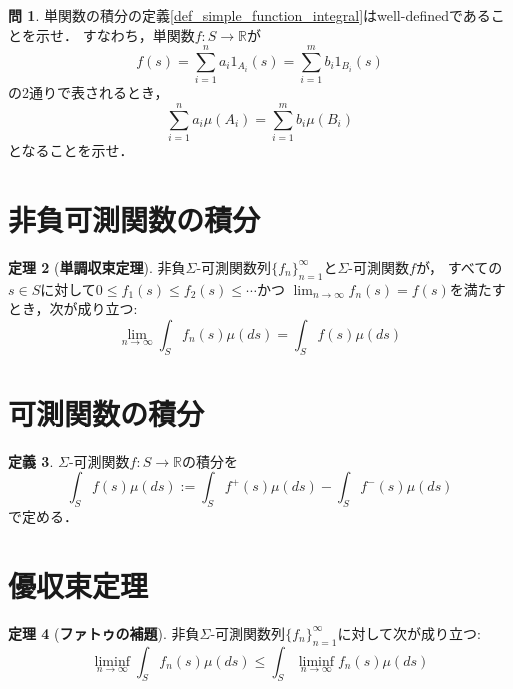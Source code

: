 \documentclass{jsreport}
\theoremstyle{definition}
\newtheorem{defi}{定義}[section]
\newtheorem{thm}[defi]{定理}
\newtheorem{qst}[defi]{問}
\begin{document}
\begin{qst}\label{qst_simple_function_integral}
単関数の積分の定義\ref{def_simple_function_integral}はwell-definedであることを示せ．
すなわち，単関数$f \colon S\to\mathbb{R}$が
\[ f(s)=\sum_{i=1}^n a_i1_{A_i}(s)=\sum_{i=1}^m b_i1_{B_i}(s) \]
の2通りで表されるとき，
\[ \sum_{i=1}^n a_i\mu(A_i)=\sum_{i=1}^m b_i\mu(B_i) \]
となることを示せ．
\end{qst}

\section{非負可測関数の積分}

\begin{thm}[\textbf{単調収束定理}]\label{monotone_convergence_theorem}
非負$\Sigma$-可測関数列$\{f_n\}_{n=1}^\infty$と$\Sigma$-可測関数$f$が，
すべての$s \in S$に対して$0 \leq f_1(s) \leq f_2(s) \leq\cdots$かつ
$\displaystyle\lim_{n\to\infty}f_n(s)=f(s)$を満たすとき，次が成り立つ:
\[ \lim_{n\to\infty}\int_S f_n(s)\mu(ds)=\int_S f(s)\mu(ds) \]
\end{thm}

\section{可測関数の積分}

\begin{defi}\label{def_measurable_function_integral}
$\Sigma$-可測関数$f \colon S\to\mathbb{R}$の積分を
\[ \int_S f(s)\mu(ds):=\int_S f^+(s)\mu(ds)-\int_S f^-(s)\mu(ds)  \]
で定める．
\end{defi}

\section{優収束定理}

\begin{thm}[\textbf{ファトゥの補題}]\label{Fatou_lemma}
非負$\Sigma$-可測関数列$\{f_n\}_{n=1}^\infty$に対して次が成り立つ:
\[ \liminf_{n\to\infty}\int_S f_n(s)\mu(ds)\leq\int_S\liminf_{n\to\infty}f_n(s)\mu(ds) \]
\end{thm}

\end{document}
